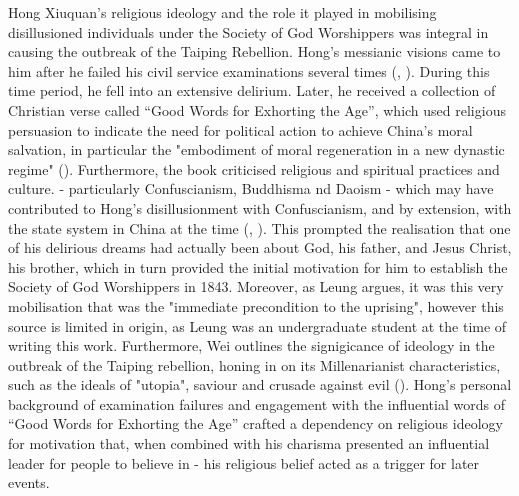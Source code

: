 Hong Xiuquan’s religious ideology and the role it played in mobilising disillusioned individuals under the Society of God Worshippers was integral in causing the outbreak of the Taiping Rebellion. Hong’s messianic visions came to him after he failed his civil service examinations several times (\cite{zotero-item-121}, \cite{leungCritiqueMarxsView2013}). During this time period, he fell into an extensive delirium. Later, he received a collection of Christian verse called “Good Words for Exhorting the Age”, which used religious persuasion to indicate the need for political action to achieve China's moral salvation, in particular the "embodiment of moral regeneration in a new dynastic regime" ({\cite{leungCritiqueMarxsView2013}). Furthermore, the book criticised religious and spiritual practices and culture. - particularly Confuscianism, Buddhisma nd Daoism - which may have contributed to Hong's disillusionment with Confuscianism, and by extension, with the state system in China at the time (\cite{PDFHongXiuquan2026}, \cite{leungCritiqueMarxsView2013}). This prompted the realisation that one of his delirious dreams had actually been about God, his father, and Jesus Christ, his brother, which in turn provided the initial motivation for him to establish the Society of God Worshippers in 1843. Moreover, as Leung argues, it was this very mobilisation that was the "immediate precondition to the uprising", however this source is limited in origin, as Leung was an undergraduate student at the time of writing this work. Furthermore, Wei outlines the signigicance of ideology in the outbreak of the Taiping rebellion, honing in on its Millenarianist characteristics, such as the ideals of "utopia", saviour and crusade against evil (\cite{chenweiReconsiderationsTaipingRebellion2022}). Hong's personal background of examination failures and engagement with the influential words of “Good Words for Exhorting the Age” crafted a dependency on religious ideology for motivation that, when combined with his charisma presented an influential leader for people to believe in - his religious belief acted as a trigger for later events. \\

}
